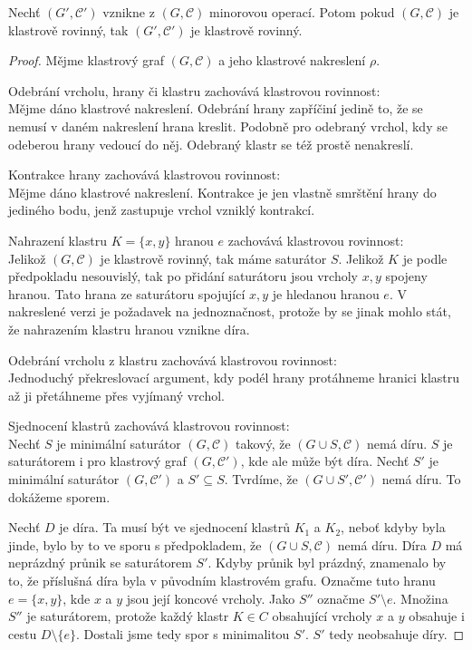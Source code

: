 \begin{tvr} Nechť $(G', \mathcal C')$ vznikne z $(G, \mathcal C)$ minorovou operací. Potom pokud $(G, \mathcal C)$ je klastrově rovinný, tak $(G', \mathcal C')$ je klastrově rovinný.
\label{min_op_zach_kl_rov}
\end{tvr}
\begin{proof}

Mějme klastrový graf $(G, \mathcal C)$ a jeho klastrové nakreslení $\rho$.

Odebrání vrcholu, hrany či klastru zachovává klastrovou rovinnost:\\
Mějme dáno klastrové nakreslení. Odebrání hrany zapříčiní jedině to, že se nemusí v daném nakreslení hrana kreslit. Podobně pro odebraný vrchol, kdy se odeberou hrany vedoucí do něj. Odebraný klastr se též prostě nenakreslí.

Kontrakce hrany zachovává klastrovou rovinnost:\\
Mějme dáno klastrové nakreslení. Kontrakce je jen vlastně smrštění hrany do jediného bodu, jenž zastupuje vrchol vzniklý kontrakcí.

Nahrazení klastru $K=\{x,y\}$ hranou $e$ zachovává klastrovou rovinnost:\\
Jelikož $(G, \mathcal C)$ je klastrově rovinný, tak máme saturátor $S$. Jelikož $K$ je podle předpokladu nesouvislý, tak po přidání saturátoru jsou vrcholy $x, y$ spojeny hranou. Tato hrana ze saturátoru spojující $x,y$ je hledanou hranou $e$. V nakreslené verzi je požadavek na jednoznačnost, protože by se jinak mohlo stát, že nahrazením klastru hranou vznikne díra.  

Odebrání vrcholu z klastru zachovává klastrovou rovinnost:\\
Jednoduchý překreslovací argument, kdy podél hrany protáhneme hranici klastru až ji přetáhneme přes vyjímaný vrchol.

Sjednocení klastrů zachovává klastrovou rovinnost:\\
Nechť $S$ je minimální saturátor $(G,\mathcal C)$ takový, že $(G \cup S,\mathcal C)$ nemá díru. $S$ je saturátorem i pro klastrový graf $(G, \mathcal C')$, kde ale může být díra.
Nechť $S'$ je minimální saturátor $(G, \mathcal C')$ a $S' \subseteq S$. Tvrdíme, že $(G \cup S',\mathcal C')$ nemá díru. To dokážeme sporem.

Nechť $D$ je díra. Ta musí být ve sjednocení klastrů $K_1$ a $K_2$, neboť kdyby byla jinde, bylo by to ve sporu s předpokladem, že $(G \cup S, \mathcal C)$ nemá díru.
Díra $D$ má neprázdný průnik se saturátorem $S'$. Kdyby průnik byl prázdný, znamenalo by to, že příslušná díra byla v původním klastrovém grafu. Označme tuto hranu $e = \{x,y\}$, kde $x$ a $y$ jsou její koncové vrcholy.
Jako $S''$ označme $S' \setminus e$. Množina $S''$ je saturátorem, protože každý klastr $K \in C$ obsahující vrcholy  $x$ a $y$ obsahuje i cestu $D \setminus \{e\}$. Dostali jsme tedy spor s minimalitou $S'$. $S'$ tedy neobsahuje díry.
\end{proof}

